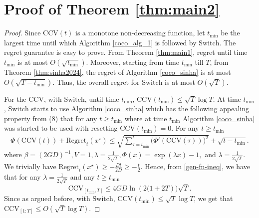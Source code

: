 \section{Proof of Theorem \ref{thm:main2}}
 \begin{proof}
 Since $\text{CCV}(t)$ is a monotone non-decreasing function, let $t_{\min}$ be the largest time until which Algorithm \ref{coco_alg_1} is followed by $\mathrm{Switch}$.
 The regret guarantee is easy to prove.  From Theorem \ref{thm:main1},
 regret until time $t_{\min}$ is at most $O(\sqrt{t_{\min}})$. Moreover, starting from time $t_{\min}$ till $T$, from Theorem \ref{thm:sinha2024}, the regret of Algorithm \ref{coco_sinha} is at most $O(\sqrt{T-t_{\min}})$. Thus, the overall regret for $\mathrm{Switch}$ is at most $O(\sqrt{T})$.
 
 For the CCV, with $\mathrm{Switch}$, until time $t_{\min}$, $\text{CCV}(t_{\min})\le \sqrt{T}\log T$. At 
 time $t_{\min}$, $\mathrm{Switch}$ starts to use Algorithm \ref{coco_sinha} which has the following appealing property from (8) \cite{Sinha2024} that for any $t\ge t_{\min}$ where at time $t_{\min}$  Algorithm \ref{coco_sinha} was started to be used with resetting $\text{CCV}(t_{\min})=0$. 
 For any $t\ge t_{\min}$
 \begin{eqnarray} \label{gen-fn-ineq}
		\Phi(\text{CCV}(t)) +\textrm{Regret}_t(x^\star) \leq \sqrt{\sum_{\tau=t_{\min}}^t \big(\Phi'(\text{CCV}(\tau))\big)^2} + \sqrt{t-t_{\min}}.
\end{eqnarray}
where $\beta = (2GD)^{-1}, V=1, \lambda = \frac{1}{2\sqrt{T}}, \Phi(x)= \exp(\lambda x)-1, $ and $\lambda=\frac{1}{2\sqrt{T}}$.
We trivially have $\textrm{Regret}_t(x^\star)\geq -\frac{Dt}{2D} \geq -\frac{t}{2}.$ Hence, from \eqref{gen-fn-ineq}, we have that for any $\lambda = \frac{1}{2\sqrt{T}}$ and any $t \ge t_{\min}$
$$\text{CCV}_{[t_{\min},T]} \leq 4GD\ln(2\big(1+2T)\big)\sqrt{T}.$$
Since as argued before, with $\mathrm{Switch}$,  $\text{CCV}(t_{\min})\le \sqrt{T}\log T$, we get that  $\text{CCV}_{[1:T]}\le O(\sqrt{T}\log T)$.
 \end{proof}